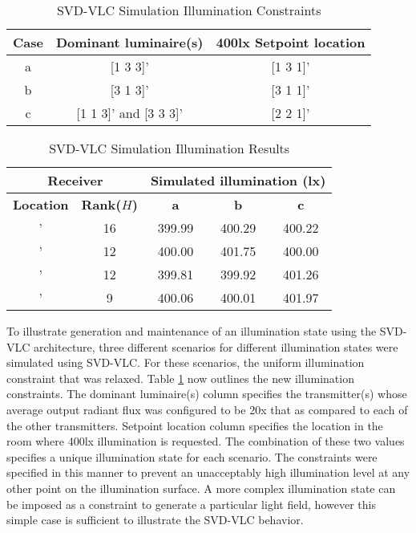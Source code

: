 \begin{table}[!t] %
\caption{SVD-VLC Simulation Illumination Constraints}
\label{tblSimulation}
\centering
	\begin{tabular}{|c|c|c|}
		\hline
		{\bf{Case}} & \bf{Dominant luminaire(s)} & \bf{400lx Setpoint location}\\
		\hline
		a & [1 3 3]' & [1 3 1]'\\
		\hline
		b & [3 1 3]' & [3 1 1]'\\
		\hline
		c & [1 1 3]' and [3 3 3]' & [2 2 1]'\\
		\hline
	\end{tabular}
\end{table}

\begin{table}[!b] %
\caption{SVD-VLC Simulation Illumination Results}
\label{tblSimulation2}
\centering
	\begin{tabular}{|c|c|c|c|c|}
		\hline
		\multicolumn{2}{|c|}{\bf{Receiver}} & \multicolumn{3}{|c|}{\bf{Simulated illumination (lx)}}\\
		\hline
		{\bf{Location}} & {\bf{Rank($H$)}} & {\bf{a}} & {\bf{b}} & {\bf{c}}\\
		\hline
		[1.6 0.6 1.0]' & 16 & 399.99 & 400.29 & 400.22\\
		\hline
		[2.8 0.4 1.4]' & 12 & 400.00 & 401.75 & 400.00\\
		\hline
		[0.2 0.8 1.0]' & 12 & 399.81 & 399.92 & 401.26\\
		\hline
		[1.2 1.4 1.6]' & 9 & 400.06 & 400.01 & 401.97\\
		\hline
	\end{tabular}
\end{table}

To  illustrate generation and maintenance of an illumination state using the SVD-VLC architecture, three different scenarios for different illumination states were simulated using SVD-VLC. For these scenarios, the uniform illumination constraint that was relaxed. Table \ref{tblSimulation} now outlines the new illumination constraints. The dominant luminaire(s) column specifies the transmitter(s) whose average output radiant flux  was configured to be 20x that as compared to each of the other transmitters. Setpoint location column specifies the location in the room where 400lx illumination is requested. The combination of these two values specifies a unique illumination state for each scenario. The constraints were specified in this manner to prevent an unacceptably high illumination level at any other point on the illumination surface. A more complex illumination state can be imposed as a constraint to generate a particular light field, however this simple case is sufficient to illustrate the SVD-VLC behavior.

